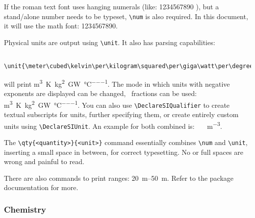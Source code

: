 If the roman text font uses hanging numerals (like:
%
1234567890%
%
), but a stand\-/alone
number needs to be typeset, \verb|\num| is also required.
In this document, it will use the math font: \num{1234567890}.

Physical units are output using \verb|\unit|.
It also has parsing capabilities:
\begin{verbatim}
    \unit{\meter\cubed\kelvin\per\kilogram\squared\per\giga\watt\per\degreeCelsius}
\end{verbatim}
will print
\unit{\meter\cubed\kelvin\per\kilogram\squared\per\giga\watt\per\degreeCelsius}.
The mode in which units with negative exponents are displayed can be changed,
\ fractions can be used:
\unit[per-mode=fraction]{\meter\cubed\kelvin\per\kilogram\squared\per\giga\watt\per\degreeCelsius}.
You can also use \verb|\DeclareSIQualifier| to create textual subscripts for units,
further specifying them, or create entirely custom units using \verb|\DeclareSIUnit|.
An example for both combined is: \unit[per-mode=fraction]{\mega\watthour\thermal\per\meter\cubed}.

The \verb|\qty{<quantity>}{<unit>}| command essentially combines \verb|\num| and
\verb|\unit|, inserting a small space in between, for correct typesetting.
No or full spaces are wrong and painful to read.

There are also commands to print ranges: \qtyrange{20}{50}{\meter}.
Refer to the package documentation for more.

\subsubsection{Chemistry}

